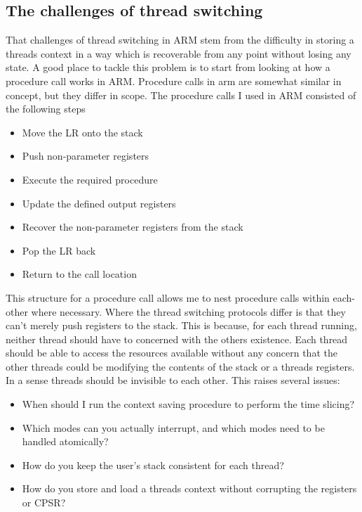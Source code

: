 \subsection{The challenges of thread switching}
That challenges of thread switching in ARM stem from the difficulty in storing a threads context in a way which is recoverable from any point without losing any state. A good place to tackle this problem is to start from looking at how a procedure call works in ARM. Procedure calls in arm are somewhat similar in concept, but they differ in scope. The procedure calls \cite{arm_man} I used in ARM consisted of the following steps
\begin{itemize}
	\item Move the LR onto the stack 
	\item Push non-parameter registers
	\item Execute the required procedure
	\item Update the defined output registers
	\item Recover the non-parameter registers from the stack
	\item Pop the LR back
	\item Return to the call location
\end{itemize} %
This structure for a procedure call allows me to nest procedure calls within each-other where necessary. Where the thread switching protocols differ is that they can't merely push registers to the stack. This is because, for each thread running, neither thread should have to concerned with the others existence. Each thread should be able to access the resources available without any concern that the other threads could be modifying the contents of the stack or a threads registers. In a sense threads should be invisible to each other. This raises several issues:
\begin{itemize}
	\item When should I run the context saving procedure to perform the time slicing?
	\item Which modes can you actually interrupt, and which modes need to be handled atomically?
	\item How do you keep the user's stack consistent for each thread?
	\item How do you store and load a threads context without corrupting the registers or CPSR?
\end{itemize}
